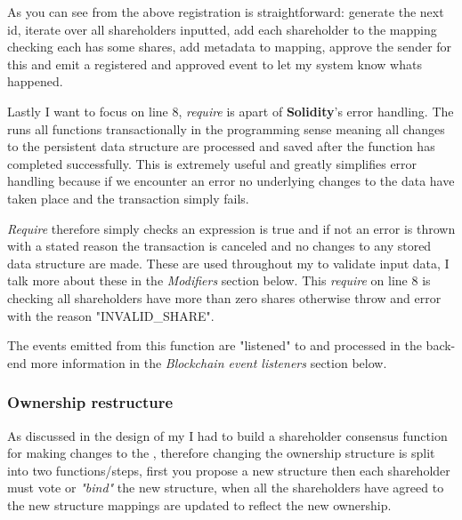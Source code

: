 As you can see from the above registration is straightforward: generate the next id, iterate over all shareholders inputted, add each shareholder to the mapping checking each has some shares, add metadata to mapping, approve the sender for this  and emit a registered and approved event to let my system know whats happened.

Lastly I want to focus on line 8, \textit{require} is apart of \textbf{Solidity}'s error handling. The  runs all functions transactionally in the programming sense meaning all changes to the persistent data structure are processed and saved after the function has completed successfully. This is extremely useful and greatly simplifies error handling because if we encounter an error no underlying changes to the data have taken place and the transaction simply fails. 

\textit{Require} therefore simply checks an expression is true and if not an error is thrown with a stated reason the transaction is canceled and no changes to any stored data structure are made. These are used throughout my  to validate input data, I talk more about these in the \textit{Modifiers} section below. This \textit{require} on line 8 is checking all shareholders have more than zero shares otherwise throw and error with the reason "INVALID\_SHARE".

The events emitted from this function are "listened" to and processed in the back-end more information in the \textit{Blockchain event listeners} section below.

\subsubsection{Ownership restructure}

As discussed in the design of my  I had to build a shareholder consensus function for making changes to the , therefore changing the ownership structure is split into two functions/steps, first you propose a new structure then each shareholder must vote or \textit{"bind"} the new structure, when all the shareholders have agreed to the new structure mappings are updated to reflect the new ownership.


